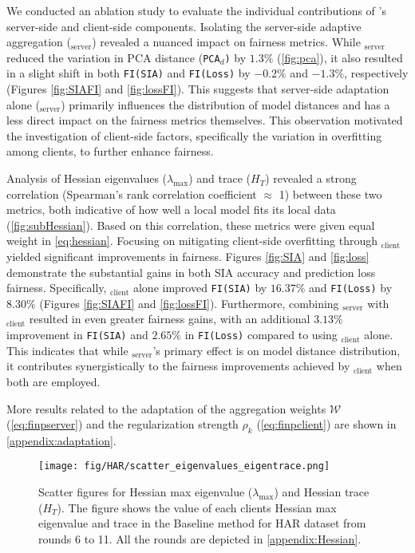 We conducted an ablation study to evaluate the individual contributions of \sysname's server-side and client-side components.  Isolating the server-side adaptive aggregation (\sysname$_\text{server}$) revealed a nuanced impact on fairness metrics.  While \sysname$_\text{server}$ reduced the variation in PCA distance (\texttt{PCA$_d$)} by $1.3\%$ (\autoref{fig:pca}), it also resulted in a slight shift in both \texttt{FI(SIA)} and \texttt{FI(Loss)} by $-0.2\%$ and $-1.3\%$, respectively (Figures \ref{fig:SIAFI} and \ref{fig:lossFI}). This suggests that server-side adaptation alone (\sysname$_\text{server}$) primarily influences the distribution of model distances and has a less direct impact on the fairness metrics themselves. This observation motivated the investigation of client-side factors, specifically the variation in overfitting among clients, to further enhance fairness.

Analysis of Hessian eigenvalues ($\lambda_{\text{max}}$) and trace ($H_{T}$) revealed a strong correlation (Spearman's rank correlation coefficient $\approx$ 1) between these two metrics, both indicative of how well a local model fits its local data (\autoref{fig:subHessian}).  Based on this correlation, these metrics were given equal weight in \autoref{eq:hessian}.  Focusing on mitigating client-side overfitting through \sysname$_\text{client}$ yielded significant improvements in fairness.  Figures \ref{fig:SIA} and \ref{fig:loss} demonstrate the substantial gains in both SIA accuracy and prediction loss fairness.  Specifically, \sysname$_\text{client}$ alone improved \texttt{FI(SIA)} by $16.37\%$ and \texttt{FI(Loss)} by $8.30\%$ (Figures \ref{fig:SIAFI} and \ref{fig:lossFI}).  Furthermore, combining \sysname$_\text{server}$ with \sysname$_\text{client}$ resulted in even greater fairness gains, with an additional $3.13\%$ improvement in \texttt{FI(SIA)} and $2.65\%$ in \texttt{FI(Loss)} compared to using \sysname$_\text{client}$ alone. This indicates that while \sysname$_\text{server}$'s primary effect is on model distance distribution, it contributes synergistically to the fairness improvements achieved by \sysname$_\text{client}$ when both are employed.


More results related to the adaptation of the aggregation weights $\mathcal{W}$ (\autoref{eq:finpserver}) and the regularization strength $\rho_k$ (\autoref{eq:finpclient}) are shown in \autoref{appendix:adaptation}. 

\begin{figure*}
\centering
\texttt{[image: fig/HAR/scatter\_eigenvalues\_eigentrace.png]}
\caption{Scatter figures for Hessian max eigenvalue ($\lambda_{\text{max}}$) and Hessian trace ($H_{T}$).  The figure shows the value of each clients Hessian max eigenvalue and trace in the Baseline method for HAR dataset from rounds 6 to 11. All the rounds are depicted in \autoref{appendix:Hessian}.}
\label{fig:subHessian}
\end{figure*}


